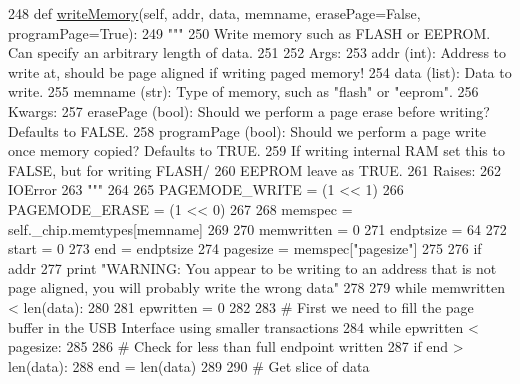 \begin{DoxyCode}
248     \textcolor{keyword}{def }\hyperlink{classsoftware_1_1chipwhisperer_1_1hardware_1_1naeusb_1_1programmer__xmega_1_1XMEGAPDI_a6bd915fe8154e77d629915c3b0e942d8}{writeMemory}(self, addr, data, memname, erasePage=False, programPage=True):
249         \textcolor{stringliteral}{"""}
250 \textcolor{stringliteral}{        Write memory such as FLASH or EEPROM. Can specify an arbitrary length of data.}
251 \textcolor{stringliteral}{}
252 \textcolor{stringliteral}{        Args:}
253 \textcolor{stringliteral}{            addr (int): Address to write at, should be page aligned if writing paged memory!}
254 \textcolor{stringliteral}{            data (list): Data to write.}
255 \textcolor{stringliteral}{            memname (str): Type of memory, such as "flash" or "eeprom".}
256 \textcolor{stringliteral}{        Kwargs:}
257 \textcolor{stringliteral}{            erasePage (bool): Should we perform a page erase before writing? Defaults to FALSE.}
258 \textcolor{stringliteral}{            programPage (bool): Should we perform a page write once memory copied? Defaults to TRUE.}
259 \textcolor{stringliteral}{                                If writing internal RAM set this to FALSE, but for writing FLASH/}
260 \textcolor{stringliteral}{                                EEPROM leave as TRUE.}
261 \textcolor{stringliteral}{        Raises:}
262 \textcolor{stringliteral}{            IOError}
263 \textcolor{stringliteral}{        """}
264 
265         PAGEMODE\_WRITE = (1 << 1)
266         PAGEMODE\_ERASE = (1 << 0)
267 
268         memspec = self.\_chip.memtypes[memname]
269 
270         memwritten = 0
271         endptsize = 64
272         start = 0
273         end = endptsize
274         pagesize = memspec[\textcolor{stringliteral}{"pagesize"}]
275 
276         \textcolor{keywordflow}{if} addr %
277             \textcolor{keywordflow}{print} \textcolor{stringliteral}{"WARNING: You appear to be writing to an address that is not page aligned, you will
       probably write the wrong data"}
278 
279         \textcolor{keywordflow}{while} memwritten < len(data):
280 
281             epwritten = 0
282 
283             \textcolor{comment}{# First we need to fill the page buffer in the USB Interface using smaller transactions}
284             \textcolor{keywordflow}{while} epwritten < pagesize:
285 
286                 \textcolor{comment}{# Check for less than full endpoint written}
287                 \textcolor{keywordflow}{if} end > len(data):
288                     end = len(data)
289 
290                 \textcolor{comment}{# Get slice of data}

\end{DoxyCode}

